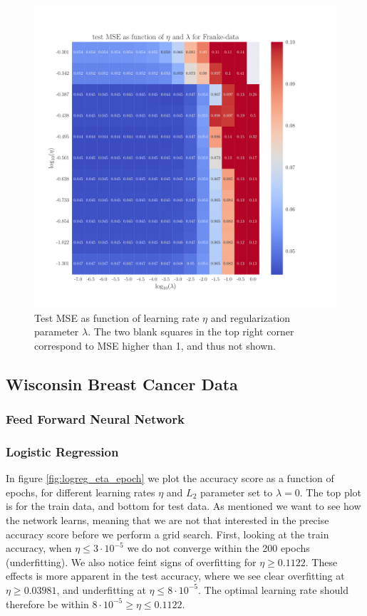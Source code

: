 \documentclass[12pt]{extarticle}
\begin{document}
\begin{figure}[h]
	\includegraphics[width=\linewidth]{plots/NN_Franke__eta_lambda__test_MSE__228448.pdf}
	\caption{Test MSE as function of learning rate $\eta$ and regularization parameter $\lambda$. The two blank squares in the top right corner correspond to MSE higher than 1, and thus not shown.}\label{fig:NN_lambda}
\end{figure}


\subsection{Wisconsin Breast Cancer Data}
\subsubsection{Feed Forward Neural Network}
\clearpage
\subsubsection{Logistic Regression}

In figure \ref{fig:logreg_eta_epoch} we plot the accuracy score as a function of epochs, for different learning rates $\eta$ and $L_2$ parameter set to $\lambda = 0$. The top plot is for the train data, and bottom for test data. As mentioned we want to see how the network learns, meaning that we are not that interested in the precise accuracy score before we perform a grid search. First, looking at the train accuracy, when $\eta \leq 3\cdot 10^{-5}$ we do not converge within the 200 epochs (underfitting). We also notice feint signs of overfitting for $\eta\geq 0.1122$. These effects is more apparent in the test accuracy, where we see clear overfitting at $\eta \geq 0.03981$, and underfitting at $\eta\leq 8\cdot 10^{-5}$. The optimal learning rate should therefore be within $8\cdot 10^{-5} \geq \eta \leq 0.1122$.
\end{document}
